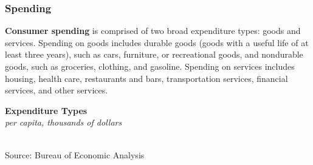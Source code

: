 \documentclass{report}
\makeatletter
\newcommand{\tbllink}[1]{\href{https://raw.githubusercontent.com/bdecon/US-chartbook/master/chartbook/data/#1}{\faTable}}
\newcommand*\short[1]{\expandafter\@gobbletwo\number\numexpr#1\relax}
\newcommand{\stdnode}[3]{\node[below, align=left, shift=({#1,#2})]{#3};}
\newcommand{\shdateaxisticks}{
		date coordinates in=x, axis line style={draw=none},
		xmax={2023-02-15},
		max space between ticks=40,	    
		xtick={{1990-01-01}, {1995-01-01}, {2000-01-01}, 
			{2005-01-01}, {2010-01-01}, {2015-01-01}, {2020-01-01}},
		minor xtick={},
		enlarge y limits={0.06}, enlarge x limits={0.01},
		}
\newcommand{\bbar}[2]{extra #1 ticks = {{#2}}, extra #1 tick labels = ,
		extra #1 tick style = {grid=major, grid style={thick, black!25}},}
\newcommand{\stdline}[4]{\addplot[very thick, no markers, color=#1] 
		table [x=#2, y=#3, col sep=comma] {#4};	}
\newcommand{\rbars}{
		\fill[color=black!10] (axis cs:{1990-07-01},\pgfkeysvalueof{/pgfplots/ymin}) rectangle 
			(axis cs:{1991-03-01}, \pgfkeysvalueof{/pgfplots/ymax});
		\fill[color=black!10] (axis cs:{2007-12-01},\pgfkeysvalueof{/pgfplots/ymin}) rectangle 
			(axis cs:{2009-07-01}, \pgfkeysvalueof{/pgfplots/ymax});
		\fill[color=black!10] (axis cs:{2001-03-01},\pgfkeysvalueof{/pgfplots/ymin}) rectangle 
			(axis cs:{2001-11-01}, \pgfkeysvalueof{/pgfplots/ymax});
		\fill[color=black!10] (axis cs:{2020-02-01},\pgfkeysvalueof{/pgfplots/ymin}) rectangle 
			(axis cs:{2020-05-01}, \pgfkeysvalueof{/pgfplots/ymax});}
\makeatother
\begin{document}
{\begin{minipage}{0.76\textwidth}
\subsubsection*{Spending}
\small \textbf{Consumer spending} is comprised of two broad expenditure types: goods and services. Spending on goods includes durable goods (goods with a useful life of at least three years), such as cars, furniture, or recreational goods, and nondurable goods, such as groceries, clothing, and gasoline. Spending on services includes housing, health care, restaurants and bars, transportation services, financial services, and other services. 
\end{minipage}
\vspace{2mm}

\begin{minipage}{0.37\textwidth}
\normalsize \textbf{Expenditure Types}\\
\footnotesize{\textit{per capita, thousands of dollars}}\\
\hspace*{-2mm} \\
\footnotesize{Source: Bureau of Economic Analysis} \hspace{8mm} \tbllink{pce_levels.csv}
\end{minipage} \hspace{8mm}
\begin{minipage}{0.33\textwidth}
\small 
\end{minipage}
\vspace{2mm}

}
\end{document}
